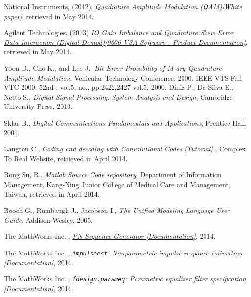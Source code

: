 \documentclass[12pt,a4paper,openright]{report}
\begin{document}
\begin{thebibliography}{1}
National Instruments, (2012), \href{http://www.ni.com/white-paper/3896/en/}{\emph{Quadrature Amplitude Modulation (QAM)[White paper]}}, retrieved in May 2014.

Agilent Technologies, (2013) \href{http://wireless.agilent.com/wireless/helpfiles/89600B/WebHelp/subsystems/digdemod/content/digdemod_para_interact_iqgainimb_quadskewerr.htm}{\emph{IQ Gain Imbalance and Quadrature Skew Error Data Interaction (Digital Demod)[9600 VSA Software - Product Documentation]}}, retrieved in May 2014.

Yoon D., Cho K., and Lee J., \emph{Bit Error Probability of M-ary Quadrature Amplitude Modulation}, Vehicular Technology Conference, 2000. IEEE-VTS Fall VTC 2000. 52nd , vol.5, no., pp.2422,2427 vol.5, 2000.
Diniz P., Da Silva E., Netto S., \emph{Digital Signal Processing: System Analysis and Design}, Cambridge University Press, 2010.

Sklar B., \emph{Digital Communications Fundamentals and Applications}, Prentice Hall, 2001.

Langton C., \href{http://complextoreal.com/wp-content/uploads/2013/01/convo.pdf}{\emph{Coding and decoding with Convolutional Codes [Tutorial] }}, Complex To Real Website, retrieved in April 2014. 

Rong Su, R., \href{http://mis.knjc.edu.tw/~ronald/course/matlab/Matlab-source/communication/71ca84878640/all_chapters/Chapter8/}{\emph{Matlab Source Code repository}}, Department of Information Management, Kang-Ning Junior College of Medical Care and Management, Taiwan, retrieved in April 2014.

Booch G., Rumbaugh J., Jacobson I., \emph{The Unified Modeling Language User Guide}, Addison-Wesley, 2005.

The MathWorks Inc. , \href{http://www.mathworks.se/help/comm/ref/pnsequencegenerator.html}{\emph{PN Sequence Generator [Documentation]}},  2014.


The MathWorks Inc. , \href{http://www.mathworks.se/help/ident/ref/impulseest.html}{\emph{\texttt{impulseest}: Nonparametric impulse response estimation [Documentation]}}, 2014.

The MathWorks Inc. , \href{http://www.mathworks.se/help/dsp/ref/fdesign.parameq.html?searchHighlight=fdesign.parameq}{\emph{\texttt{fdesign.parameq}: Parametric equalizer filter specification [Documentation]}},  2014.



\end{thebibliography}
\end{document}
